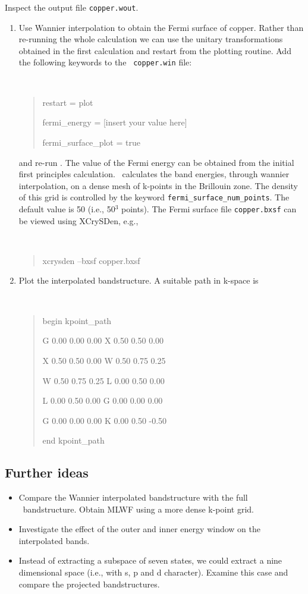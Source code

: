 \documentclass[a4paper,11pt,twoside]{article}
\begin{document}
Inspect the output file {\tt copper.wout}. 

\begin{enumerate}
\item Use Wannier interpolation to obtain the Fermi surface of
  copper. Rather than re-running the whole calculation we can use the
  unitary transformations obtained in the first calculation and restart
  from the plotting routine. Add the following keywords to the {\tt
    copper.win} file:
{\tt
\begin{quote}
restart = plot

fermi\_energy = [insert your value here] 

fermi\_surface\_plot = true
\end{quote} }
and re-run \wannier. The value of the Fermi energy can be  
obtained from the initial first principles calculation. \wannier\
calculates the band energies, through wannier interpolation, on a
dense mesh of k-points in the Brillouin zone. The density of this grid is
controlled by the keyword {\tt fermi\_surface\_num\_points}. The default
value is 50 (i.e., 50$^3$ points).
The Fermi surface file {\tt copper.bxsf} can be viewed using XCrySDen,
e.g., 
{\tt
\begin{quote}
xcrysden --bxsf copper.bxsf
\end{quote} }


\item Plot the interpolated bandstructure. A suitable path in k-space is
\smallskip
{\tt
\begin{quote}
begin kpoint\_path

G 0.00  0.00  0.00    X 0.50  0.50  0.00

X 0.50  0.50  0.00    W 0.50  0.75  0.25

W 0.50  0.75  0.25    L 0.00  0.50  0.00

L 0.00  0.50  0.00    G 0.00  0.00  0.00

G 0.00  0.00  0.00    K 0.00  0.50 -0.50
 
end kpoint\_path
\end{quote} }
\end{enumerate}

\subsection*{Further ideas}
\begin{itemize}
\item Compare the Wannier interpolated bandstructure with the full
  \pwscf\ bandstructure. Obtain MLWF using a more dense k-point grid.
\item Investigate the effect of the outer and inner energy window on
  the interpolated bands. 
\item Instead of extracting a subspace of seven states, we could extract a
  nine dimensional space (i.e., with s, p and d character). Examine this case
  and compare the projected bandstructures. 
\end{itemize}
\end{document}
